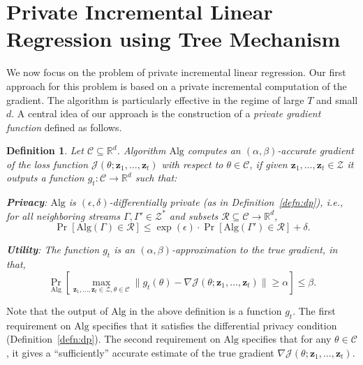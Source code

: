 \documentclass{article}
\theoremstyle{plain}
\newtheorem{definition}{Definition}
\def \eps {\epsilon}
\def \z {\mathbf z}
\def \CCC {\mathcal{C}}
\def \RRR {\mathcal{R}}
\def \ZZZ {\mathcal{Z}}
\def \JJJ {\mathcal{J}}
\def \Alg {\mathrm{Alg}}
\def \R {\mathbb{R}}
\begin{document}
\section{Private Incremental Linear Regression using Tree Mechanism} \label{sec:smalld}
We now focus on the problem of private incremental linear regression. Our first approach for this problem is based on a private incremental computation of the gradient. The algorithm is particularly effective in the regime of large $T$ and small $d$. A central idea of our approach is the construction of a {\em private gradient function} defined as follows.
\begin{definition} \label{defn:privgradfunc}
Let $\CCC \subseteq \R^d$. Algorithm $\Alg$ computes an $(\alpha,\beta)$-accurate gradient of the loss function $\JJJ(\theta;\z_1,\dots,\z_t)$ with respect to $\theta \in \CCC$, if given $\z_1,\dots,\z_t \in \ZZZ$ it outputs a function $g_t: \CCC \rightarrow \R^d$ such that:
\begin{list}{{\bf ()}}{
\setlength{\leftmargin}{\parindent}
\setlength{\listparindent}{\parindent}
\setlength{\parsep}{0pt}}
\item \label{res:privacy} {\bf Privacy}: $\Alg$ is $(\eps,\delta)$-differentially private (as in Definition~\ref{defn:dp}), i.e., for all neighboring streams $\Gamma, \Gamma' \in \ZZZ^\ast$ and subsets $\RRR \subseteq \CCC \rightarrow \R^d$,
$$\Pr[\Alg(\Gamma) \in \RRR] \leq \exp(\eps) \cdot \Pr[\Alg(\Gamma') \in \RRR]+\delta.$$
\item \label{res:utility} {\bf Utility}: The function $g_t$ is an $(\alpha,\beta)$-approximation to the true gradient, in that, 
$$\Pr_{\Alg}\left[\max_{\z_1,\dots,\z_t \in\ZZZ, \theta\in\CCC}\| g_t(\theta) - \nabla \JJJ(\theta;\z_1,\dots,\z_t)  \| \geq \alpha\right]\leq\beta.$$
\end{list}
\end{definition}
Note that the output of $\Alg$ in the above definition is a function $g_t$. The first requirement on $\Alg$ specifies that it satisfies the differential privacy condition (Definition~\ref{defn:dp}). The second requirement on $\Alg$ specifies that for any $\theta \in \CCC$, it gives a ``sufficiently'' accurate estimate of the true gradient $\nabla \JJJ(\theta;\z_1,\dots,\z_t)$.
\end{document}
